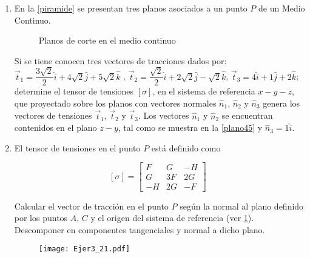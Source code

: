 \documentclass[../notas medios.tex]{subfiles}
\begin{document}
\begin{enumerate}
\begin{enumerate}
\end{enumerate} 
%
\item \label{punto20} En la \cref{piramide} se presentan tres planos asociados a un punto $P$ de un Medio Continuo.
%
\begin{figure}[H]
	\centering
		\hspace{2.0cm}
	\caption{Planos de corte en el medio continuo}
\end{figure}
%
 Si se tiene conocen tres vectores de tracciones dados por: $\overset{\rightarrow} t _{1}= \dfrac{3 \sqrt{2}}{2} \hat{i} + 4 \sqrt{2} \hat{j} + 5 \sqrt{2} \hat{k}$ , $\overset{\rightarrow} t _{2}= \dfrac{\sqrt{2}}{2} \hat{i} + 2 \sqrt{2} \hat{j} -  \sqrt{2} \hat{k}$, 
$\overset{\rightarrow} t _{3}= 4 \hat{i} + 1 \hat{j} + 2 \hat{k}$; determine el tensor de tensiones $ \left[ \sigma \right] $, en el sistema de referencia $x-y-z$, que proyectado sobre los planos con vectores normales $\hat{n}_{1}$, $\hat{n}_{2}$ y $\hat{n}_{3}$ genera los vectores de tensiones $\overset{\rightarrow} t _{1}$, $\overset{\rightarrow} t _{2}$ y $\overset{\rightarrow} t _{3}$. Los vectores $\hat{n}_{1}$ y $\hat{n}_{2}$ se encuentran contenidos en el plano $z-y$, tal como se muestra en la \cref{plano45} y $\hat{n}_{3}=1 \hat{i}$.

\item \label{punto21} El tensor de tensiones en el punto $P$ está definido
como
%	
\begin{large}
	\[ [\sigma] = \left[ \begin{array}{ccc}
	F & G & -H \\ 
	G & 3F & 2G \\ 
	-H & 2G & -F
	\end{array}  \right] \enspace\]
\end{large}
%
Calcular el vector de tracción en el punto $P$ seg\'un la normal al plano definido por los puntos $A$, $C$ y el origen del sistema de referencia (ver \cref{vecplano}). Descomponer en componentes tangenciales y normal a dicho plano.
\begin{figure}[H]
	\centering
	\texttt{[image: Ejer3\_21.pdf]}
	\vspace{-.5 cm}
	\caption{}
	\label{vecplano}
\end{figure}


\end{enumerate}
\end{document}
